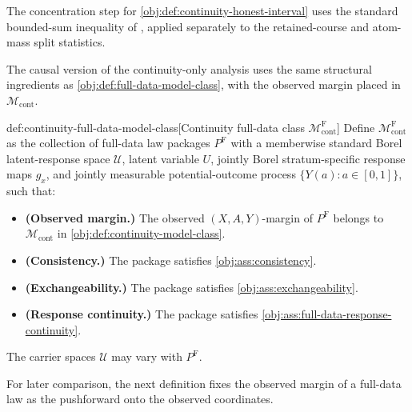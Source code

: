 The concentration step for \cref{obj:def:continuity-honest-interval} uses the standard bounded-sum inequality of \citet[Theorem~2]{Hoeffding1963}, applied separately to the retained-course and atom-mass split statistics.

The causal version of the continuity-only analysis uses the same structural ingredients as \cref{obj:def:full-data-model-class}, with the observed margin placed in \(\mathcal M_{\mathrm{cont}}\).

\begin{definitionv}{def:continuity-full-data-model-class}[Continuity full-data class \(\mathcal M_{\mathrm{cont}}^{\mathrm F}\)]
Define \(\mathcal M_{\mathrm{cont}}^{\mathrm F}\) as the collection of full-data law packages \(P^{\mathrm F}\) with a memberwise standard Borel latent-response space \(\mathcal U\), latent variable \(U\), jointly Borel stratum-specific response maps \(g_x\), and jointly measurable potential-outcome process \(\{Y(a):a\in[0,1]\}\), such that:
\begin{itemize}
\item \textbf{(Observed margin.)} The observed \((X,A,Y)\)-margin of \(P^{\mathrm F}\) belongs to \(\mathcal M_{\mathrm{cont}}\) in \cref{obj:def:continuity-model-class}.
\item \textbf{(Consistency.)} The package satisfies \cref{obj:ass:consistency}.
\item \textbf{(Exchangeability.)} The package satisfies \cref{obj:ass:exchangeability}.
\item \textbf{(Response continuity.)} The package satisfies \cref{obj:ass:full-data-response-continuity}.
\end{itemize}
The carrier spaces \(\mathcal U\) may vary with \(P^{\mathrm F}\).
\end{definitionv}

For later comparison, the next definition fixes the observed margin of a full-data law as the pushforward onto the observed coordinates.

